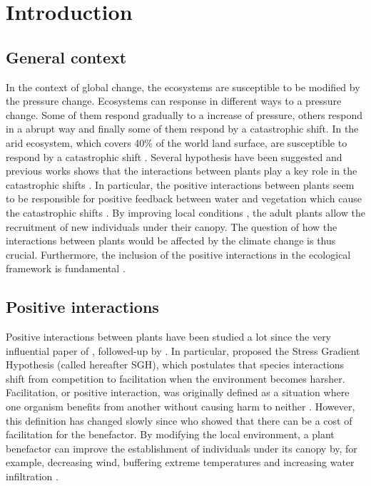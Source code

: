 \documentclass[12pt, a4paper]{article} %
\begin{document}


\tableofcontents

\section{Introduction}
\subsection{General context}
In the context of global change, the ecosystems are susceptible to be modified by the pressure change. Ecosystems can response in different ways to a pressure change. Some of them respond gradually to a increase of pressure, others respond in a abrupt way and finally some of them respond by a catastrophic shift. In the arid ecosystem, which covers 40\% of the world land surface, are susceptible to respond by a catastrophic shift \citep{Kefi2007}. Several hypothesis have been suggested and previous works shows that the interactions between plants play a key role in the catastrophic shifts \citep{Rietkerk2004,Kefi2007}. In particular, the positive interactions between plants seem to be responsible for positive feedback between water and vegetation which cause the catastrophic shifts \citep{Walker1981}. By improving local conditions , the adult plants allow the recruitment of new individuals under their canopy. The question of how the interactions between plants would be affected by the climate change is thus crucial. Furthermore, the inclusion of the positive interactions in the ecological framework is fundamental \citep{Bruno2003}.
\subsection{Positive interactions}
Positive interactions between plants have been studied a lot since the very influential paper of \citep{Bertness1994}, followed-up by \citep{Bruno2003}. In particular, \citet{Bertness1994} proposed the Stress Gradient Hypothesis (called hereafter SGH), which postulates that species interactions shift from competition to facilitation when the environment becomes harsher. Facilitation, or positive interaction, was originally defined as a situation where one organism benefits from another without causing harm to neither \citep{Bruno2003}. However, this definition has changed slowly since \citet{Schob2014} who showed that there can be a cost of facilitation for the benefactor.
By modifying the local environment, a plant benefactor can improve the establishment of individuals under its canopy by, for example, decreasing wind, buffering extreme temperatures and increasing water infiltration \citep{Rietkerk1997}. 
\end{document}
